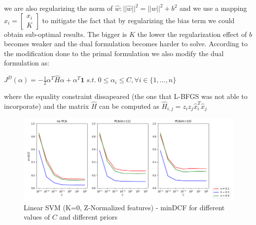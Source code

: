 \documentclass[10pt, a4paper, twocolumn]{article} %
\begin{document}
we are also regularizing the norm of $\hat{w}: ||\hat{w}||^2 = ||w||^2 + b^2$ and we use a mapping
$\hat{x}_i = \begin{bmatrix} x_i\\ K \end{bmatrix}$ to mitigate the fact that by regularizing  the bias
term we could obtain sub-optimal results. The bigger is $K$ the lower the regularization effect of $b$
becomes weaker and the dual formulation becomes harder to solve. According to the modification done to
the primal formulation we also modify the dual formulation as:
\begin{center}
	\begin{math}
		J^D(\alpha)=-\frac{1}{2}\alpha^T\hat{H}\alpha + \alpha^T\textbf{1} \; s.t.\; 0 \le \alpha_i \le C, \forall i\in \{1,...,n\}
	\end{math}
\end{center}
where the equality constraint dissapeared (the one that L-BFGS was not able to incorporate) and the
matrix $\hat{H}$ can be computed as $\hat{H}_{i,j}=z_iz_j\hat{x}_i^T\hat{x}_j$
\begin{figure}[ht!]
	\includegraphics[width=\linewidth]{./Pictures/FeaturesAnalysis/LSVM.png}
	\caption{Linear SVM (K=0, Z-Normalized features) - minDCF for different values of $C$ and different priors}
	\label{lsvm} 
\end{figure}
\end{document}
